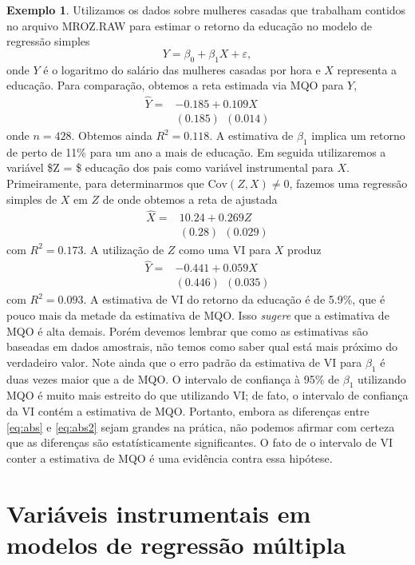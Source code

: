 \documentclass[
]{book}
\theoremstyle{definition}
\theoremstyle{definition}
\newtheorem{example}{Exemplo}[chapter]
\theoremstyle{definition}
\theoremstyle{remark}
\begin{document}
\begin{example}
\protect\hypertarget{exm:mroz}{}{\label{exm:mroz} }Utilizamos os dados sobre mulheres casadas que trabalham contidos no arquivo MROZ.RAW para estimar o retorno da educação no modelo de regressão simples
\[Y=\beta_0+\beta_1 X+\varepsilon,\]
onde \(Y\) é o logaritmo do salário das mulheres casadas por hora e \(X\) representa a educação. Para comparação, obtemos a reta estimada via MQO para \(Y\),
\begin{align}
\hat Y=&-0.185+0.109X\\
&(0.185) \ \ (0.014)\nonumber
\label{eq:abs}
\end{align}
onde \(n=428\). Obtemos ainda \(R^2=0.118\). A estimativa de \(\beta_1\) implica um retorno de perto de 11\% para um ano a mais de educação. Em seguida utilizaremos a variável \$Z = \$ educação dos pais como variável instrumental para \(X\). Primeiramente, para determinarmos que \(\mbox{Cov}(Z,X)\neq0\), fazemos uma regressão simples de \(X\) em \(Z\) de onde obtemos a reta de ajustada
\begin{align*}
\hat X=&10.24+0.269Z\\
&(0.28) \ \ (0.029)
\end{align*}
com \(R^2=0.173\). A utilização de \(Z\) como uma VI para \(X\) produz
\begin{align}
\hat Y=&-0.441+0.059X\\
&(0.446) \ \ (0.035)\nonumber
\label{eq:abs}
\end{align}
com \(R^2=0.093\). A estimativa de VI do retorno da educação é de 5.9\%, que é pouco mais da metade da estimativa de MQO. Isso \emph{sugere} que a estimativa de MQO é alta demais. Porém devemos lembrar que como as estimativas são baseadas em dados amostrais, não temos como saber qual está mais próximo do verdadeiro valor. Note ainda que o erro padrão da estimativa de VI para \(\beta_1\) é duas vezes maior que a de MQO. O intervalo de confiança à 95\% de \(\beta_1\) utilizando MQO é muito mais estreito do que utilizando VI; de fato, o intervalo de confiança da VI contém a estimativa de MQO. Portanto, embora as diferenças entre \eqref{eq:abs} e \eqref{eq:abs2} sejam grandes na prática, não podemos afirmar com certeza que as diferenças são estatísticamente significantes. O fato de o intervalo de VI conter a estimativa de MQO é uma evidência contra essa hipótese.
\end{example}

\hypertarget{variuxe1veis-instrumentais-em-modelos-de-regressuxe3o-muxfaltipla}{%
\section{Variáveis instrumentais em modelos de regressão múltipla}\label{variuxe1veis-instrumentais-em-modelos-de-regressuxe3o-muxfaltipla}}
\end{document}
